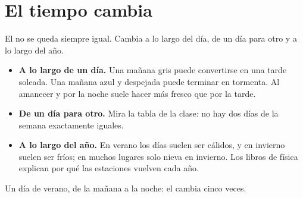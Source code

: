 \section{El tiempo cambia}

El  no se queda siempre igual. Cambia a lo largo del día, de un día
para otro y a lo largo del año.

\begin{itemize}
  \item \textbf{A lo largo de un día.} Una mañana gris puede convertirse en
        una tarde soleada. Una mañana azul y despejada puede terminar en
        tormenta. Al amanecer y por la noche suele hacer más fresco que por
        la tarde.
  \item \textbf{De un día para otro.} Mira la tabla de la clase: no hay dos
        días de la semana exactamente iguales.
  \item \textbf{A lo largo del año.} En verano los días suelen ser
        cálidos, y en invierno suelen ser fríos; en muchos lugares solo
        nieva en invierno. Los libros de física explican por qué las
        estaciones vuelven cada año.
\end{itemize}

\begin{omfigure}

{\small Un día de verano, de la mañana a la noche: el  cambia cinco
veces.}
\label{fig:g1:watching-the-weather:day}
\end{omfigure}

